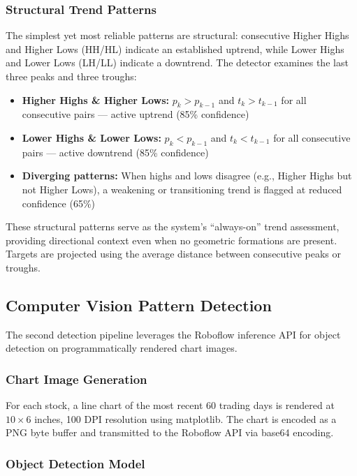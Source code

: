 \documentclass[12pt,a4paper]{article}
\begin{document}
\subsubsection{Structural Trend Patterns}

The simplest yet most reliable patterns are structural: consecutive Higher Highs and Higher Lows (HH/HL) indicate an established uptrend, while Lower Highs and Lower Lows (LH/LL) indicate a downtrend. The detector examines the last three peaks and three troughs:

\begin{itemize}
    \item \textbf{Higher Highs \& Higher Lows:} $p_{k} > p_{k-1}$ and $t_{k} > t_{k-1}$ for all consecutive pairs --- active uptrend (85\% confidence)
    \item \textbf{Lower Highs \& Lower Lows:} $p_{k} < p_{k-1}$ and $t_{k} < t_{k-1}$ for all consecutive pairs --- active downtrend (85\% confidence)
    \item \textbf{Diverging patterns:} When highs and lows disagree (e.g., Higher Highs but not Higher Lows), a weakening or transitioning trend is flagged at reduced confidence (65\%)
\end{itemize}

These structural patterns serve as the system's ``always-on'' trend assessment, providing directional context even when no geometric formations are present. Targets are projected using the average distance between consecutive peaks or troughs.

\subsection{Computer Vision Pattern Detection}

The second detection pipeline leverages the Roboflow inference API for object detection on programmatically rendered chart images.

\subsubsection{Chart Image Generation}

For each stock, a line chart of the most recent 60 trading days is rendered at $10 \times 6$ inches, 100 DPI resolution using matplotlib. The chart is encoded as a PNG byte buffer and transmitted to the Roboflow API via base64 encoding.

\subsubsection{Object Detection Model}
\end{document}
